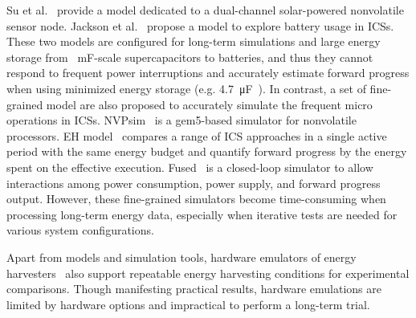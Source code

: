 Su et al.~\cite{Su:2019:TFR:3340300.3320270} provide a model dedicated to a dual-channel solar-powered nonvolatile sensor node. Jackson et al.~\cite{Jackson:2019:COC:3302506.3310400} propose a model to explore battery usage in ICSs. These two models are configured for long-term simulations and large energy storage from \SI{}{\milli\farad}-scale supercapacitors to batteries, and thus they cannot respond to frequent power interruptions and accurately estimate forward progress when using minimized energy storage (e.g. \SI{4.7}{\micro\farad}~\cite{10.1145/3281300}).
In contrast, a set of fine-grained model are also proposed to accurately simulate the frequent micro operations in ICSs. 
NVPsim~\cite{7428003} is a gem5-based simulator for nonvolatile processors.
EH model~\cite{8574572} compares a range of ICS approaches in a single active period with the same energy budget and quantify forward progress by the energy spent on the effective execution. Fused~\cite{sliper2020fused} is a closed-loop simulator to allow interactions among power consumption, power supply, and forward progress output. However, these fine-grained simulators become time-consuming when processing long-term energy data, especially when iterative tests are needed for various system configurations. 

Apart from models and simulation tools, hardware emulators of energy harvesters~\cite{10.1145/2668332.2668336, 10.1145/3356250.3360042} also support repeatable energy harvesting conditions for experimental comparisons. Though manifesting practical results, hardware emulations are limited by hardware options and impractical to perform a long-term trial. 

